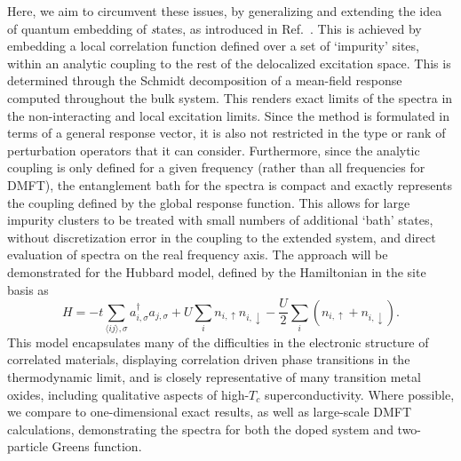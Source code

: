 \documentclass[aps,showpacs,twocolumn,nobibnotes]{revtex4}
\begin{document}
Here, we aim to circumvent these issues, by generalizing and extending the idea of quantum embedding of {\emph states}, as introduced in Ref.~. 
This is achieved by embedding a local correlation function defined over a set of `impurity' sites, within an analytic coupling to the rest of the delocalized excitation
space. This is determined through the Schmidt decomposition of a mean-field response computed throughout the bulk system. This renders exact limits of the spectra in the non-interacting and
local excitation limits. Since the method is formulated in terms of 
a general response vector, it is also not restricted in the type or rank of perturbation operators that it can consider. Furthermore, since the analytic coupling is only defined for a given
frequency (rather than all frequencies for DMFT), the entanglement bath for the spectra is compact and exactly represents the coupling defined by the global response function. This allows for large impurity
clusters to be treated with small numbers of additional `bath' states, without discretization error in the coupling to the extended system, and direct evaluation of spectra on the
real frequency axis. The approach will be demonstrated for the Hubbard model, defined by the Hamiltonian in the site basis as
\begin{equation}
    H = -t \sum_{\langle ij \rangle, \sigma} a_{i,\sigma}^{\dagger}a_{j,\sigma} + U \sum_i n_{i,\uparrow} n_{i,\downarrow} - \frac{U}{2}\sum_i (n_{i,\uparrow} + n_{i,\downarrow})  . \label{eqn:hub}
\end{equation}
This model encapsulates many of the difficulties in the electronic structure of correlated materials, displaying correlation driven phase transitions in the thermodynamic limit, and 
is closely representative of many transition metal oxides, including qualitative aspects of high-$T_c$ superconductivity\cite{Millis2013,Anderson87}.
Where possible, we compare to one-dimensional exact results\cite{Lieb68,Ovchinni1970}, as well as large-scale DMFT calculations\cite{Go2009}, demonstrating the spectra for both the doped
system and two-particle Greens function.
\end{document}
